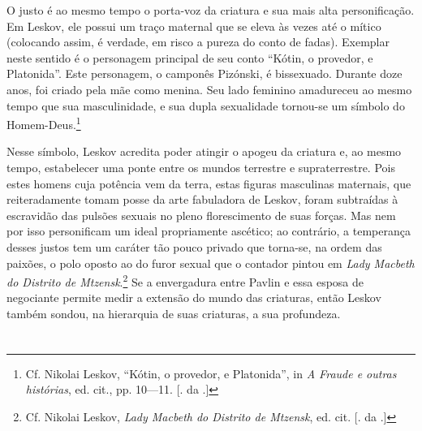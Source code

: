O justo é ao mesmo tempo o porta-voz da criatura e sua mais alta
personificação. Em Leskov, ele possui um traço maternal que se eleva às
vezes até o mítico (colocando assim, é verdade, em risco a pureza do
conto de fadas). Exemplar neste sentido é o personagem principal de seu
conto ``Kótin, o provedor, e Platonida''. Este personagem, o camponês
Pizónski, é bissexuado. Durante doze anos, foi criado pela mãe como
menina. Seu lado feminino amadureceu ao mesmo tempo que sua
masculinidade, e sua dupla sexualidade tornou-se um símbolo do
Homem-Deus.\footnote{Cf. Nikolai Leskov, ``Kótin, o provedor, e
  Platonida'', in \emph{A Fraude e outras histórias}, ed. cit., pp.
  10---11. [. da .]}

Nesse símbolo, Leskov acredita poder atingir o apogeu da criatura e, ao
mesmo tempo, estabelecer uma ponte entre os mundos terrestre e
supraterrestre. Pois estes homens cuja potência vem da terra, estas
figuras masculinas maternais, que reiteradamente tomam posse da arte
fabuladora de Leskov, foram subtraídas à escravidão das pulsões sexuais
no pleno florescimento de suas forças. Mas nem por isso personificam um
ideal propriamente ascético; ao contrário, a temperança desses justos
tem um caráter tão pouco privado que torna-se, na ordem das paixões, o
polo oposto ao do furor sexual que o contador pintou em \emph{Lady
Macbeth do Distrito de Mtzensk}.\footnote{Cf. Nikolai Leskov, \emph{Lady
  Macbeth do Distrito de Mtzensk}, ed. cit. [. da .]} Se a
envergadura entre Pavlin e essa esposa de negociante permite medir a
extensão do mundo das criaturas, então Leskov também sondou, na
hierarquia de suas criaturas, a sua profundeza.

\section{}

